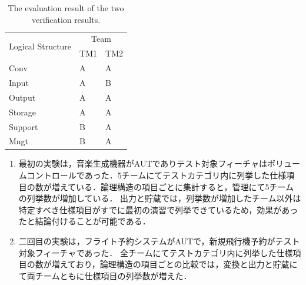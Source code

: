 \documentclass[a4paper,12pt]{jreport}
\begin{document}
\begin{table}[htbp]
  \centering
  \caption{The evaluation result of the two verification results.}
    \begin{tabular}{|l|l|l|}
    \hline
    \multicolumn{1}{|c|}{\multirow{2}[4]{*}{Logical
Structure}} & \multicolumn{2}{c|}{Team} \bigstrut\\
\cline{2-3}          & TM1   & TM2 \bigstrut\\
    \hline
    Conv  & A     & A \bigstrut\\
    \hline
    Input & A     & B \bigstrut\\
    \hline
    Output & A     & A \bigstrut\\
    \hline
    Storage & A     & A \bigstrut\\
    \hline
    Support & B     & A \bigstrut\\
    \hline
    Mngt  & B     & A \bigstrut\\
    \hline
    \end{tabular}%
  \label{tbl:D-3-tbl6}%
\end{table}%

\begin{enumerate}
\item 最初の実験は，音楽生成機器がAUTでありテスト対象フィーチャはボリュームコントロールであった．5チームにてテストカテゴリ内に列挙した仕様項目の数が増えている．論理構造の項目ごとに集計すると，管理にて5チームの列挙数が増加している． 出力と貯蔵では，列挙数が増加したチーム以外は特定すべき仕様項目がすでに最初の演習で列挙できているため，効果があったと結論付けることが可能である．
\item 二回目の実験は，フライト予約システムがAUTで，新規飛行機予約がテスト対象フィーチャであった． 全チームにてテストカテゴリ内に列挙した仕様項目の数が増えており，論理構造の項目ごとの比較では，変換と出力と貯蔵にて両チームともに仕様項目の列挙数が増えた．
\end{enumerate}
\end{document}
